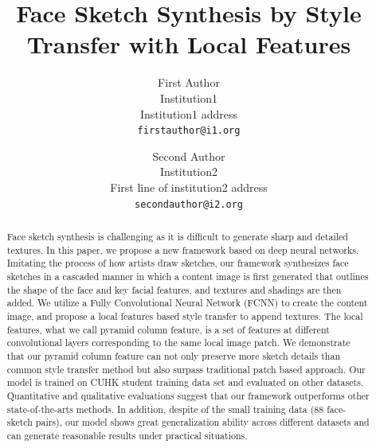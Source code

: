 \documentclass[10pt,twocolumn,letterpaper]{article}
\begin{document}
\title{Face Sketch Synthesis by Style Transfer with Local Features}

\author{First Author\\
Institution1\\
Institution1 address\\
{\tt\small firstauthor@i1.org}
\and
Second Author\\
Institution2\\
First line of institution2 address\\
{\tt\small secondauthor@i2.org}
}

\maketitle


\begin{abstract}

Face sketch synthesis is challenging as it is difficult to generate sharp and detailed textures. In this paper, we propose a new framework based on deep neural networks. Imitating the process of how artists draw sketches, our framework synthesizes face sketches in a cascaded manner in which a content image is first generated that outlines the shape of the face and key facial features, and textures and shadings are then added. We utilize a Fully Convolutional Neural Network (FCNN) to create the content image, and propose a local features based style transfer to append textures. The local features, what we call pyramid column feature, is a set of features at different convolutional layers corresponding to the same local image patch. We demonstrate that our pyramid column feature can not only preserve more sketch details than common style transfer method but also surpass traditional patch based approach. Our model is trained on CUHK student training data set and evaluated on other datasets. Quantitative and qualitative evaluations suggest that our framework outperforms other state-of-the-arts methods. In addition, despite of the small training data (88 face-sketch pairs), our model shows great generalization ability across different datasets and can generate reasonable results under practical situations.

\end{abstract}
\end{document}
